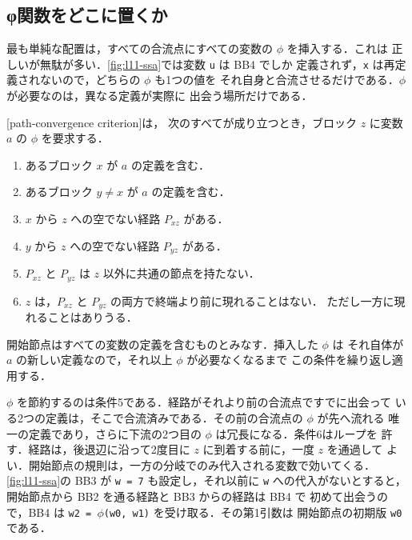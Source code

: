 \documentclass[../main.tex]{subfiles}
\begin{document}
\subsection{φ関数をどこに置くか}

最も単純な配置は，すべての合流点にすべての変数の $\phi$ を挿入する．これは
正しいが無駄が多い．\cref{fig:l11-ssa}では変数 \texttt{u} は BB4 でしか
定義されず，\texttt{x} は再定義されないので，どちらの $\phi$ も1つの値を
それ自身と合流させるだけである．$\phi$ が必要なのは，異なる定義が実際に
出会う場所だけである．

\begin{definition}[経路収束条件]
  \label{def:l11-path-convergence}
  [path-convergence criterion]は，
  次のすべてが成り立つとき，ブロック $z$ に変数 $a$ の $\phi$ を要求する．
  \begin{enumerate}
    \item あるブロック $x$ が $a$ の定義を含む．
    \item あるブロック $y \neq x$ が $a$ の定義を含む．
    \item $x$ から $z$ への空でない経路 $P_{xz}$ がある．
    \item $y$ から $z$ への空でない経路 $P_{yz}$ がある．
    \item $P_{xz}$ と $P_{yz}$ は $z$ 以外に共通の節点を持たない．
    \item $z$ は，$P_{xz}$ と $P_{yz}$ の両方で終端より前に現れることはない．
      ただし一方に現れることはありうる．
  \end{enumerate}
  開始節点はすべての変数の定義を含むものとみなす．挿入した $\phi$ は
  それ自体が $a$ の新しい定義なので，それ以上 $\phi$ が必要なくなるまで
  この条件を繰り返し適用する．
\end{definition}

%
$\phi$ を節約するのは条件5である．経路がそれより前の合流点ですでに出会って
いる2つの定義は，そこで合流済みである．その前の合流点の $\phi$ が先へ流れる
唯一の定義であり，さらに下流の2つ目の $\phi$ は冗長になる．条件6はループを
許す．経路は，後退辺に沿って2度目に $z$ に到着する前に，一度 $z$ を通過して
よい．開始節点の規則は，一方の分岐でのみ代入される変数で効いてくる．
\cref{fig:l11-ssa}の BB3 が \texttt{w = 7} も設定し，それ以前に \texttt{w}
への代入がないとすると，開始節点から BB2 を通る経路と BB3 からの経路は BB4 で
初めて出会うので，BB4 は \texttt{w2 = $\phi$(w0, w1)} を受け取る．その第1引数は
開始節点の初期版 \texttt{w0} である．
\end{document}
